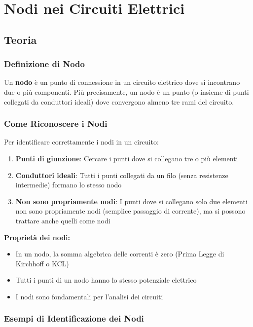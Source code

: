 \documentclass[a4paper,12pt]{article}
\begin{document}
\newpage
\section{Nodi nei Circuiti Elettrici}

\subsection{Teoria}

\subsubsection{Definizione di Nodo}
Un \textbf{nodo} è un punto di connessione in un circuito elettrico dove si incontrano due o più componenti. Più precisamente, un nodo è un punto (o insieme di punti collegati da conduttori ideali) dove convergono almeno tre rami del circuito.

\subsubsection{Come Riconoscere i Nodi}

Per identificare correttamente i nodi in un circuito:

\begin{enumerate}
    \item \textbf{Punti di giunzione}: Cercare i punti dove si collegano tre o più elementi
    \item \textbf{Conduttori ideali}: Tutti i punti collegati da un filo (senza resistenze intermedie) formano lo stesso nodo
    \item \textbf{Non sono propriamente nodi}: I punti dove si collegano solo due elementi non sono propriamente nodi (semplice passaggio di corrente), ma si possono trattare anche quelli come nodi
\end{enumerate}

\textbf{Proprietà dei nodi:}
\begin{itemize}
    \item In un nodo, la somma algebrica delle correnti è zero (Prima Legge di Kirchhoff o KCL)
    \item Tutti i punti di un nodo hanno lo stesso potenziale elettrico
    \item I nodi sono fondamentali per l'analisi dei circuiti
\end{itemize}

\subsubsection{Esempi di Identificazione dei Nodi}
\end{document}

